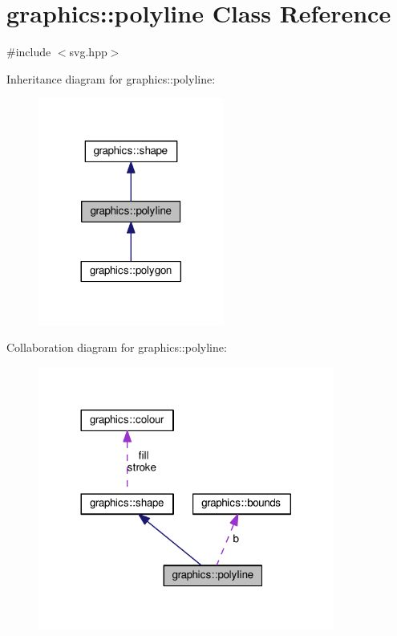 \hypertarget{classgraphics_1_1polyline}{}\section{graphics\+:\+:polyline Class Reference}
\label{classgraphics_1_1polyline}


{\ttfamily \#include $<$svg.\+hpp$>$}



Inheritance diagram for graphics\+:\+:polyline\+:
\nopagebreak
\begin{figure}[H]
\begin{center}
\leavevmode
\includegraphics[width=173pt]{classgraphics_1_1polyline__inherit__graph}
\end{center}
\end{figure}


Collaboration diagram for graphics\+:\+:polyline\+:
\nopagebreak
\begin{figure}[H]
\begin{center}
\leavevmode
\includegraphics[width=276pt]{classgraphics_1_1polyline__coll__graph}
\end{center}
\end{figure}
